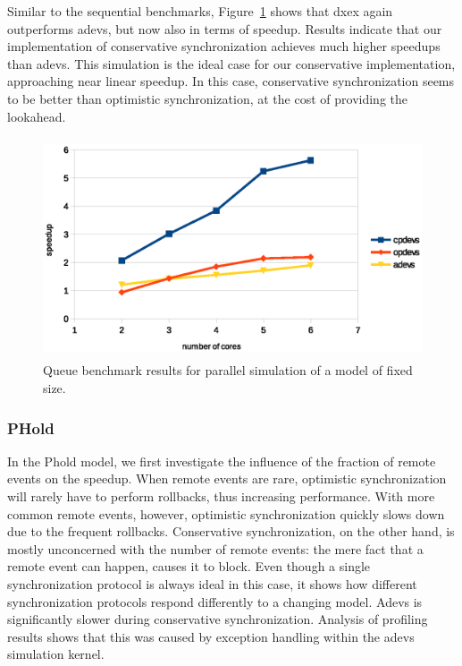 Similar to the sequential benchmarks, Figure~\ref{fig:queue_benchmark_parallel} shows that dxex again outperforms adevs, but now also in terms of speedup.
Results indicate that our implementation of conservative synchronization achieves much higher speedups than adevs.
This simulation is the ideal case for our conservative implementation, approaching near linear speedup.
In this case, conservative synchronization seems to be better than optimistic synchronization, at the cost of providing the lookahead.

\begin{figure}
	\includegraphics[width=\columnwidth,height=6.5cm]{fig/queue_parallel.eps}
	\caption{Queue benchmark results for parallel simulation of a model of fixed size.}
	\label{fig:queue_benchmark_parallel}
\end{figure}

\subsubsection{PHold}
In the Phold model, we first investigate the influence of the fraction of remote events on the speedup.
When remote events are rare, optimistic synchronization will rarely have to perform rollbacks, thus increasing performance.
With more common remote events, however, optimistic synchronization quickly slows down due to the frequent rollbacks.
Conservative synchronization, on the other hand, is mostly unconcerned with the number of remote events: the mere fact that a remote event can happen, causes it to block.
Even though a single synchronization protocol is always ideal in this case, it shows how different synchronization protocols respond differently to a changing model.
Adevs is significantly slower during conservative synchronization.
Analysis of profiling results shows that this was caused by exception handling within the adevs simulation kernel.

